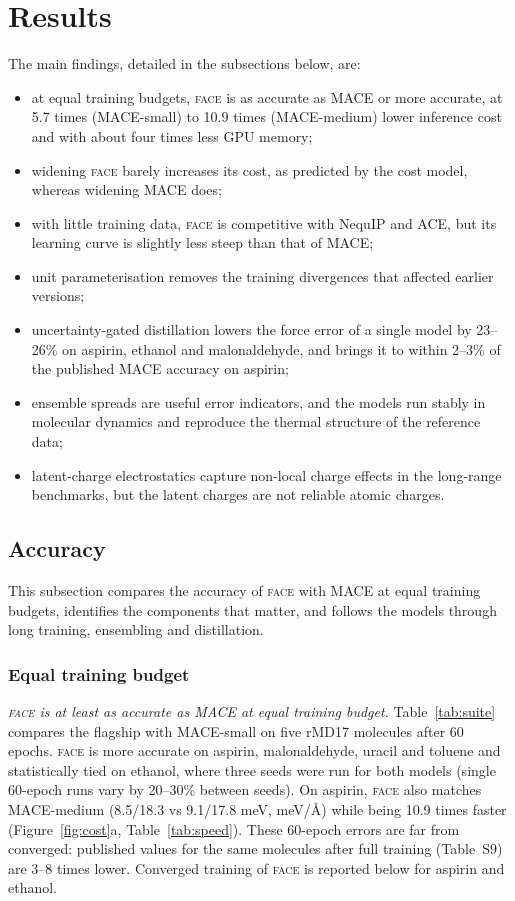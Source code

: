 \documentclass[journal=jctcce,manuscript=article,layout=traditional]{achemso}
\newcommand{\FACE}{\textup{\textsc{face}}}
\begin{document}
\section{Results}
\label{sec:results}
The main findings, detailed in the subsections below, are:
\begin{itemize}
\item at equal training budgets, \FACE{} is as accurate as MACE or more accurate, at 5.7 times (MACE-small) to 10.9
times (MACE-medium) lower inference cost and with about four times less GPU memory;
\item widening \FACE{} barely increases its cost, as predicted by the cost model, whereas widening MACE does;
\item with little training data, \FACE{} is competitive with NequIP and ACE, but its learning curve is slightly
less steep than that of MACE;
\item unit parameterisation removes the training divergences that affected earlier versions;
\item uncertainty-gated distillation lowers the force error of a single model by 23--26\% on aspirin, ethanol and
malonaldehyde, and brings it to within 2--3\% of the published MACE accuracy on aspirin;
\item ensemble spreads are useful error indicators, and the models run stably in molecular dynamics and reproduce the
thermal structure of the reference data;
\item latent-charge electrostatics capture non-local charge effects in the long-range benchmarks, but the latent
charges are not reliable atomic charges.
\end{itemize}

\subsection{Accuracy}
This subsection compares the accuracy of \FACE{} with MACE at equal training budgets, identifies the components
that matter, and follows the models through long training, ensembling and distillation.

\subsubsection{Equal training budget}
\emph{\FACE{} is at least as accurate as MACE at equal training budget.} Table~\ref{tab:suite} compares the flagship
with MACE-small on five rMD17 molecules after 60 epochs. \FACE{} is more
accurate on aspirin, malonaldehyde, uracil and toluene and statistically tied on ethanol, where three seeds were run
for both models (single 60-epoch runs vary by 20--30\% between seeds). On aspirin, \FACE{} also matches MACE-medium
(8.5/18.3 vs 9.1/17.8 meV, meV/\AA) while being 10.9 times faster (Figure~\ref{fig:cost}a, Table~\ref{tab:speed}).
These 60-epoch errors are far from converged: published values for the same molecules after full training
(Table~S9) are 3--8 times lower. Converged training of \FACE{} is reported below for aspirin and ethanol.
\end{document}
